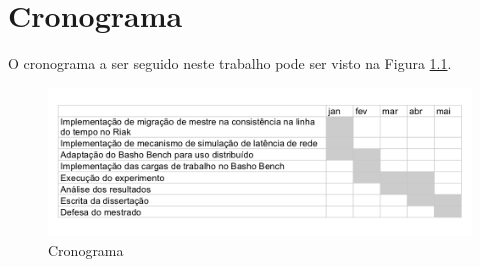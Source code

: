 \chapter{Cronograma}
\label{cap:cronograma}

O cronograma a ser seguido neste trabalho pode ser visto na Figura \ref{fig:cronograma}.

\begin{figure}[!h]
  \centering
  \includegraphics[width=1.00\columnwidth]{cronograma} 
  \caption{Cronograma}
  \label{fig:cronograma} 
\end{figure}

